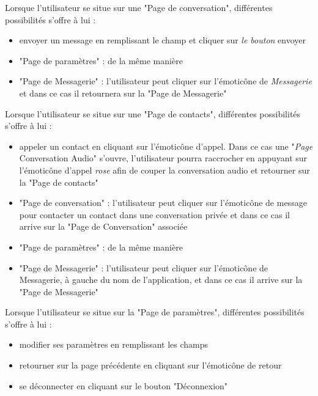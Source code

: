 	Lorsque l'utilisateur se situe sur une "Page de conversation", différentes possibilités s'offre à lui :
	\begin{itemize}
		\item envoyer un message en remplissant le champ et cliquer sur \textit{le bouton} envoyer
		\item "Page de paramètres" : de la même manière
		\item "Page de Messagerie" : l'utilisateur peut cliquer sur l’émoticône de \textit{Messagerie} et dans ce cas il retournera sur la "Page de Messagerie"\\
	\end{itemize}

	\newpage

	Lorsque l'utilisateur se situe sur une "Page de contacts", différentes possibilités s'offre à lui :
	\begin{itemize}
		\item appeler un contact en cliquant sur l’émoticône d'appel.
		Dans ce cas une "\textit{Page} Conversation Audio" s'ouvre, l'utilisateur pourra raccrocher en appuyant sur l’émoticône d'appel \textit{rose} afin de couper la conversation audio et retourner sur la "Page de contacts"
		\item "Page de conversation" : l'utilisateur peut cliquer sur l’émoticône de message pour contacter un contact dans une conversation privée et dans ce cas il arrive sur la "Page de Conversation" associée
		\item "Page de paramètres" : de la même manière
		\item "Page de Messagerie" : l'utilisateur peut cliquer sur l’émoticône de Messagerie, à gauche du nom de l'application, et dans ce cas il arrive sur la "Page de Messagerie"\\
	\end{itemize}

	Lorsque l'utilisateur se situe sur la "Page de paramètres", différentes possibilités s'offre à lui :
	\begin{itemize}
		\item modifier ses paramètres en remplissant les champs
		\item retourner sur la page précédente en cliquant sur l’émoticône de retour
		\item se déconnecter en cliquant sur le bouton "Déconnexion"\\
	\end{itemize}

